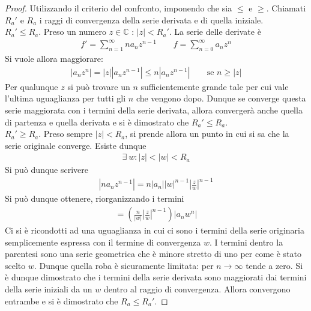 \documentclass[a4paper, oneside]{article}
\begin{document}
\begin{proof}
    Utilizzando il criterio del confronto, imponendo che sia $\leq$ e $\geq$. Chiamati 
    $R_a'$ e $R_a$ i raggi di convergenza della serie derivata e di quella iniziale. \\
    $R_a' \leq R_a$. Preso un numero $z \in \mathbb{C}$ : $\left| z \right| < R_a'$. La
    serie delle derivate è 
    \begin{gather*}
        f' = \sum_{n = 1}^{\infty } na_n z^{n - 1} \qquad f = \sum_{n = 0}^{\infty }a_nz^{n}  
    \end{gather*} 
    Si vuole allora maggiorare:
    \begin{gather*}
        \left| a_n z^{n} \right| = \left| z \right| \left| a_n z^{n - 1} \right| \leq n \left| a_n z^{n - 1} \right| \qquad \text{se } n \geq \left| z \right|     
    \end{gather*}
    Per qualunque $z$ si può trovare un $n$ sufficientemente grande tale per cui vale
    l'ultima uguaglianza per tutti gli $n$ che vengono dopo. Dunque se converge questa serie maggiorata
    con i termini della serie derivata, allora convergerà anche quella di partenza e quella derivata e 
    si è dimostrato che $R_a' \leq R_a$.  \\
    $R_a' \geq R_a$. Preso sempre $\left| z \right| < R_a$, si prende allora un punto in cui 
    si sa che la serie originale converge. Esiste dunque 
    \begin{gather*}
        \exists \ w : \left| z \right| < \left| w \right| < R_a  
    \end{gather*} 
    Si può dunque scrivere
    \begin{gather*}
        \left| na_nz^{n - 1} \right| = n\left| a_n \right| \left| w \right|^{n - 1}\left| \frac{z}{w} \right|    ^{n -1}
    \end{gather*}
    Si può dunque ottenere, riorganizzando i termini
    \begin{gather*}
        = \left(\frac{n}{\left| w \right| } \left| \frac{z}{w} \right|^{n - 1} \right)\left| a_n w^{n} \right| 
    \end{gather*}
    Ci si è ricondotti ad una uguaglianza in cui ci sono i termini della serie originaria semplicemente 
    espressa con il termine di convergenza $w$. I termini dentro la parentesi sono 
    una serie geometrica che è minore stretto di uno per come è stato scelto $w$. Dunque 
    quella roba è sicuramente limitata: per $n \to \infty$ tende a zero. Si è dunque 
    dimostrato che i termini della serie derivata sono maggiorati dai termini della serie 
    iniziali da un $w$ dentro al raggio di convergenza. Allora convergono entrambe e 
    si è dimostrato che $R_a \leq R_a'$. 
\end{proof}
\end{document}
